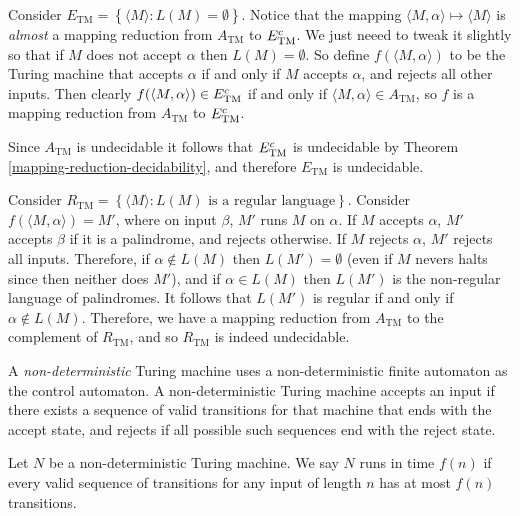 \begin{exmp}
    Consider $E_{\textrm{TM}} = \left\{\langle M \rangle : L(M) = \emptyset\right\}$. Notice that the mapping $\langle M, \alpha \rangle \mapsto \langle M \rangle$ is \emph{almost} a mapping reduction from $A_{\textrm{TM}}$ to $E_{\textrm{TM}}^{c}$. We just neeed to tweak it slightly so that if $M$ does not accept $\alpha$ then $L(M) = \emptyset$. So define $f(\langle M, \alpha \rangle)$ to be the Turing machine that accepts $\alpha$ if and only if $M$ accepts $\alpha$, and rejects all other inputs. Then clearly $f(\langle M, \alpha \rangle) \in E_{\textrm{TM}}^{c}$ if and only if $\langle  M, \alpha \rangle \in A_{\textrm{TM}}$, so $f$ is a mapping reduction from $A_{\textrm{TM}}$ to $E_{\textrm{TM}}^{c}$.

    Since $A_{\textrm{TM}}$ is undecidable it follows that $E_{\textrm{TM}}^{c}$ is undecidable by Theorem \ref{mapping-reduction-decidability}, and therefore $E_{\textrm{TM}}$ is undecidable.
\end{exmp}

\begin{exmp}
    Consider $R_{\textrm{TM}} = \left\{\langle M \rangle : L(M) \textrm{ is a regular language}\right\}$. Consider $f(\langle M, \alpha \rangle) = M'$, where on input $\beta$, $M'$ runs $M$ on $\alpha$. If $M$ accepts $\alpha$, $M'$ accepts $\beta$ if it is a palindrome, and rejects otherwise. If $M$ rejects $\alpha$, $M'$ rejects all inputs. Therefore, if $\alpha \not\in L(M)$ then $L(M') = \emptyset$ (even if $M$ nevers halts since then neither does $M'$), and if $\alpha \in L(M)$ then $L(M')$ is the non-regular language of palindromes. It follows that $L(M')$ is regular if and only if $\alpha \not\in L(M)$. Therefore, we have a mapping reduction from $A_{\textrm{TM}}$ to the complement of $R_{\textrm{TM}}$, and so $R_{\textrm{TM}}$ is indeed undecidable.
\end{exmp}

\begin{defn}
    A \emph{non-deterministic} Turing machine uses a non-deterministic finite automaton as the control automaton. A non-deterministic Turing machine accepts an input if there exists a sequence of valid transitions for that machine that ends with the accept state, and rejects if all possible such sequences end with the reject state.
\end{defn}

\begin{defn}
    Let $N$ be a non-deterministic Turing machine. We say $N$ runs in time $f(n)$ if every valid sequence of transitions for any input of length $n$ has at most $f(n)$ transitions.
\end{defn}


